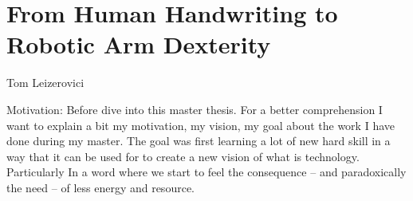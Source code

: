 \vspace{3cm}
\chapter*{\centering \Huge From Human Handwriting to
Robotic Arm Dexterity}
{\centering Tom Leizerovici}

Motivation: Before dive into this master thesis. For a better comprehension I want to explain a bit my motivation, my vision, my goal about the work I have done during my master. The goal was first learning a lot of new hard skill in a way that it can be used for to create a new vision of what is technology. Particularly In a word where we start to feel the consequence -- and paradoxically the need -- of less energy and resource. 



\pagebreak